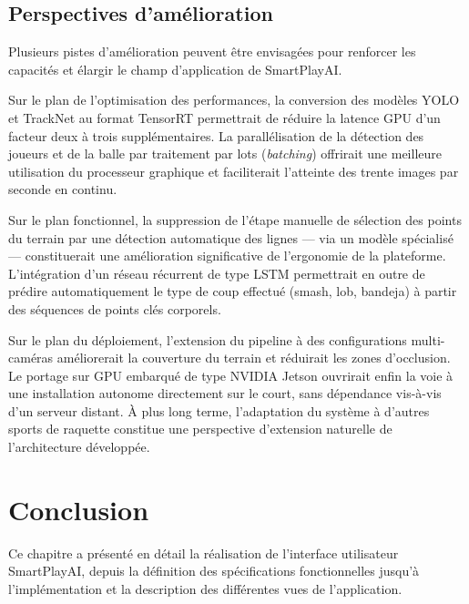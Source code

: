 \subsection{Perspectives d'amélioration}

Plusieurs pistes d'amélioration peuvent être envisagées pour renforcer les
capacités et élargir le champ d'application de SmartPlayAI.

Sur le plan de l'optimisation des performances, la conversion des modèles YOLO et
TrackNet au format TensorRT permettrait de réduire la latence GPU d'un facteur
deux à trois supplémentaires. La parallélisation de la détection des joueurs et de
la balle par traitement par lots (\textit{batching}) offrirait une meilleure
utilisation du processeur graphique et faciliterait l'atteinte des trente images
par seconde en continu.

Sur le plan fonctionnel, la suppression de l'étape manuelle de sélection des
points du terrain par une détection automatique des lignes — via un modèle
spécialisé — constituerait une amélioration significative de l'ergonomie de la
plateforme. L'intégration d'un réseau récurrent de type LSTM permettrait en outre
de prédire automatiquement le type de coup effectué (smash, lob, bandeja) à partir
des séquences de points clés corporels.

Sur le plan du déploiement, l'extension du pipeline à des configurations
multi-caméras améliorerait la couverture du terrain et réduirait les zones
d'occlusion. Le portage sur GPU embarqué de type NVIDIA Jetson ouvrirait enfin la
voie à une installation autonome directement sur le court, sans dépendance
vis-à-vis d'un serveur distant. À plus long terme, l'adaptation du système à
d'autres sports de raquette constitue une perspective d'extension naturelle de
l'architecture développée.

\section{Conclusion}
 
Ce chapitre a présenté en détail la réalisation de l'interface utilisateur SmartPlayAI, depuis
la définition des spécifications fonctionnelles jusqu'à l'implémentation et la description
des différentes vues de l'application.
 
